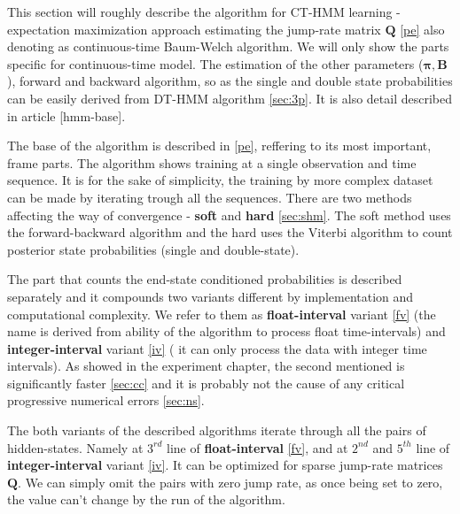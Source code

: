 \documentclass[thesis=M,english]{FITthesis}[2012/10/20]
\newcommand{\matr}[1]{\mathbf{#1}}
\begin{document}
This section will roughly describe the algorithm for CT-HMM learning - expectation maximization approach estimating the jump-rate matrix $\matr{Q}$ \ref{pe} also denoting as continuous-time Baum-Welch algorithm. We will only show the parts specific for continuous-time model. The estimation of the other parameters ($\matr{\pi},\matr{B}$), forward and backward algorithm, so as the single and double state probabilities can be easily derived from DT-HMM algorithm \ref{sec:3p}. It is also detail described in article [hmm-base].

The base of the algorithm is described in \ref{pe}, reffering to its most important, frame parts.  The algorithm shows training at a single observation and time sequence. It is for the sake of simplicity, the training by more complex dataset can be made by iterating trough all the sequences. There are two methods affecting the way of convergence - \textbf{soft} and \textbf{hard} \ref{sec:shm}. The soft method uses the forward-backward algorithm and the hard uses the Viterbi algorithm to count posterior state probabilities (single and double-state).

The part that counts the end-state conditioned probabilities is described separately and it compounds two variants different by implementation and computational complexity. We refer to them as \textbf{float-interval} variant \ref{fv} (the name is derived from ability of the algorithm to process float time-intervals) and \textbf{integer-interval} variant \ref{iv} ( it can only process the data with integer time intervals). As showed in the experiment chapter, the second mentioned is significantly faster \ref{sec:cc} and it is probably not the cause of any critical progressive numerical errors \ref{sec:ns}.

The both variants of the described algorithms iterate through all the pairs of hidden-states. Namely at $3^{rd}$ line of \textbf{float-interval} \ref{fv}, and at $2^{nd}$ and $5^{th}$ line of \textbf{integer-interval} variant \ref{iv}. It can be optimized for sparse jump-rate matrices $\matr{Q}$. We can simply omit the pairs with zero jump rate, as once being set to zero, the value can't change by the run of the algorithm.       
\end{document}
